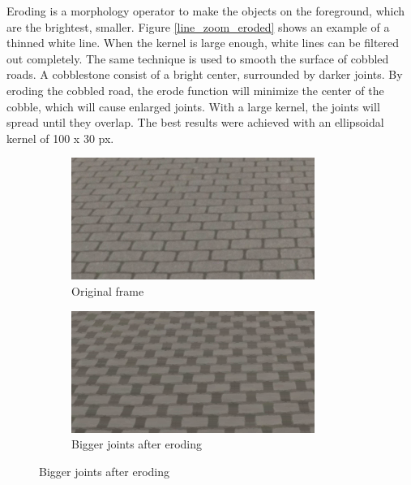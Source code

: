 \documentclass[runningheads,a4paper]{llncs}
\begin{document}
Eroding \cite{sreedhar2012enhancement} is a morphology operator to make the objects on the foreground, which are the brightest, smaller. Figure \ref{line_zoom_eroded} shows an example of a thinned white line. When the kernel is large enough, white lines can be filtered out completely. The same technique is used to smooth the surface of cobbled roads. A cobblestone consist of a bright center, surrounded by darker joints. By eroding the cobbled road, the erode function will minimize the center of the cobble, which will cause enlarged joints. With a large kernel, the joints will spread until they overlap. The best results were achieved with an ellipsoidal kernel of 100 x 30 px.

\begin{figure}[ht]
	\begin{minipage}[t]{.45\textwidth}
		\centering
		\begin{subfigure}[t]{.5\textwidth}
		  \centering
		  \includegraphics[width=.9\textwidth]{fig/cobbles_zoom_original.png}
		  \caption{Original frame\label{cobbles_zoom_original}}
		\end{subfigure}%
		\begin{subfigure}[t]{.5\textwidth}
		  \centering
		  \includegraphics[width=.9\textwidth]{fig/cobbles_zoom_eroded.png}
		  \caption{Bigger joints after eroding\label{cobbles_zoom_eroded}}
		\end{subfigure}

\end{minipage}
\end{figure}
\end{document}
